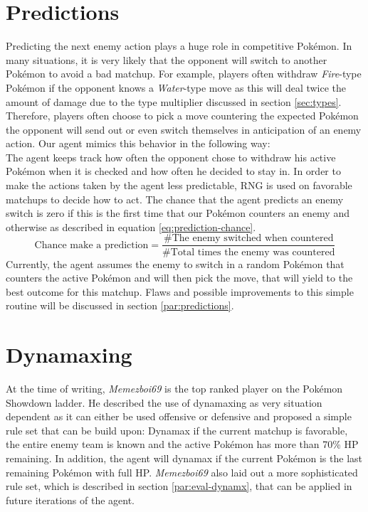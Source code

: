 \section{Predictions}
\label{sec:predictions}
Predicting the next enemy action plays a huge role in competitive Pokémon. In many situations, it is very likely
that the opponent will switch to another Pokémon to avoid a bad matchup. For example, players often withdraw 
\textit{Fire}-type Pokémon if the opponent knows a \textit{Water}-type move as this will deal twice the amount of
damage due to the type multiplier discussed in section \ref{sec:types}. Therefore, players often choose to pick a move
countering the expected Pokémon the opponent will send out or even switch themselves in anticipation of an enemy
action. Our agent mimics this behavior in the following way: \\
The agent keeps track how often the opponent chose to withdraw his active Pokémon when it is checked and how often
he decided to stay in. In order to make the actions taken by the agent less predictable, \ac{RNG} is used on
favorable matchups to decide how to act. The chance that the agent predicts an enemy switch is zero if this is 
the first time that our Pokémon counters an enemy and otherwise as described in equation \ref{eq:prediction-chance}. 
\begin{equation}
\label{eq:prediction-chance}
	\text{Chance make a prediction} = 
	\frac
	{\text{\# The enemy switched when countered}}
	{\text{\# Total times the enemy was countered}}
\end{equation}
Currently, the agent assumes the enemy to switch in a random Pokémon that counters the active Pokémon and will then 
pick the move, that will yield to the best outcome for this matchup. Flaws and possible improvements to this
simple routine will be discussed in section \ref{par:predictions}. 
\section{Dynamaxing}
\label{sec:dynamaxing}
At the time of writing, \textit{Memezboi69} is the top ranked player on the Pokémon Showdown ladder. He described
the use of dynamaxing as very situation dependent as it can either be used offensive or defensive and proposed 
a simple rule set that can be build upon:
Dynamax if the current matchup is favorable, the entire enemy team is known and the active Pokémon has more than
70\% \ac{HP} remaining. In addition, the agent will dynamax if the current Pokémon is the last remaining Pokémon
with full \ac{HP}. \textit{Memezboi69} also laid out a more sophisticated rule set, which is described in
section \ref{par:eval-dynamx}, that can be applied in future iterations of the agent.